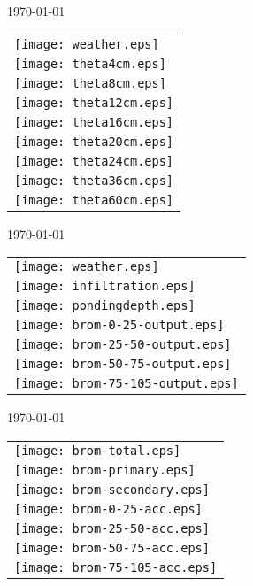 \documentclass[a4paper]{article}
\begin{document}

\newpage
\today \\
%
\begin{tabular}{l}
\texttt{[image: weather.eps]} \\
\texttt{[image: theta4cm.eps]} \\
\texttt{[image: theta8cm.eps]} \\
\texttt{[image: theta12cm.eps]} \\
\texttt{[image: theta16cm.eps]} \\
\texttt{[image: theta20cm.eps]} \\
\texttt{[image: theta24cm.eps]} \\
\texttt{[image: theta36cm.eps]} \\
\texttt{[image: theta60cm.eps]}
\end{tabular}

\newpage
\today \\
%
\begin{tabular}{l}
\texttt{[image: weather.eps]} \\
\texttt{[image: infiltration.eps]}\\
\texttt{[image: pondingdepth.eps]}\\
\texttt{[image: brom-0-25-output.eps]} \\
\texttt{[image: brom-25-50-output.eps]} \\
\texttt{[image: brom-50-75-output.eps]} \\
\texttt{[image: brom-75-105-output.eps]}
\end{tabular}

\newpage
\today \\
%
\begin{tabular}{l}
\texttt{[image: brom-total.eps]} \\
\texttt{[image: brom-primary.eps]} \\
\texttt{[image: brom-secondary.eps]} \\
\texttt{[image: brom-0-25-acc.eps]} \\
\texttt{[image: brom-25-50-acc.eps]} \\
\texttt{[image: brom-50-75-acc.eps]} \\
\texttt{[image: brom-75-105-acc.eps]}
\end{tabular}
\end{document}
